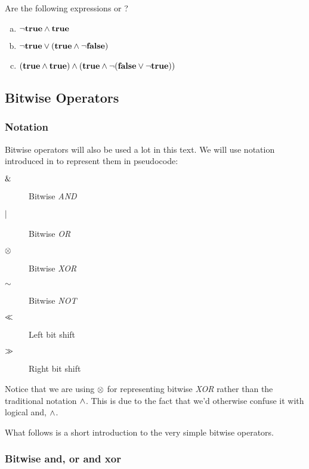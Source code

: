 \begin{Exercise}[label={boolean}]
  Are the following expressions \True or \False?

  \begin{enumerate}[(a)]
  \item $\neg \textbf{true} \wedge \textbf{true}$
  \item $\neg \textbf{true} \vee (\textbf{true} \wedge \neg \textbf{false})$

  \item $(\textbf{true} \wedge \textbf{true}) \wedge (\textbf{true} \wedge \neg(\textbf{false} \vee \neg \textbf{true}))$

  \end{enumerate}
\end{Exercise}

\subsection{Bitwise Operators}
\label{sec:bitwise-operators}

\subsubsection{Notation}

Bitwise operators will also be used a lot in this text. We will use
notation introduced in \C{}\cite{kernighan1988c} to represent them in
pseudocode:

\begin{description}
\item[$\mathrel{\&}$] Bitwise \textit{AND}
\item[$\mathrel{|}$] Bitwise \textit{OR}
\item[$\mathrel{\otimes}$] Bitwise \textit{XOR}
\item[$\mathord{\sim}$] Bitwise \textit{NOT}
\item[$\ll$] Left bit shift
\item[$\gg$] Right bit shift
\end{description}

Notice that we are using $\mathrel{\otimes}$ for representing bitwise
\textit{XOR} rather than the traditional \C notation $\wedge$. This is due to
the fact that we'd otherwise confuse it with logical and, $\wedge$.

What follows is a short introduction to the very simple bitwise
operators.

\subsubsection{Bitwise and, or and xor}

